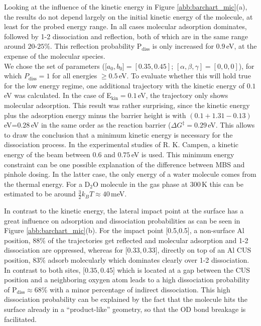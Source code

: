 \documentclass[11pt,DIV=13,BCOR=5mm,a4paper,headinclude]{scrbook}
\begin{document}
Looking at the influence of the kinetic energy in Figure \ref{abb:barchart_mic}(a), the results do not depend largely on the initial kinetic energy of the molecule, at least for the probed energy range.
In all cases molecular adsorption dominates, followed by 1-2 dissociation and reflection, both of which are in the same range around $20$-$25\%$.
This reflection probability P$_\textrm{diss}$ is only increased for $0.9\,$eV, at the expense of the molecular species.\\
We chose the set of parameters ([$a_0,b_0]=[0.35,0.45]$; $[\alpha,\beta,\gamma]=[0,0,0]$), for which $P_\textrm{diss}=1$ for all energies $\geq 0.5\,$eV.
To evaluate whether this will hold true for the low energy regime, one additional trajectory with the kinetic energy of $0.1\,$eV was calculated.
In the case of E$_\textrm{kin}=0.1\,$eV, the trajectory only shows molecular adsorption.
This result was rather surprising, since the kinetic energy plus the adsorption energy minus the barrier height is with $(0.1+1.31-0.13)\,$eV=$0.28\,$eV in the same order as the reaction barrier ($\Delta G^\ddagger=0.29\,$eV\cite{WirthJPCC2012}. %
This allows to draw the conclusion that a minimum kinetic energy is necessary for the dissociation process.
In the experimental studies of R. K. Campen\cite{Heiden11-20_2018}, a kinetic energy of the beam between $0.6$ and $0.75\,$eV is used.
This minimum energy constraint can be one possible explanation of the difference between MBS and pinhole dosing.
In the latter case, the only energy of a water molecule comes from the thermal energy.
For a D$_2$O molecule in the gas phase at $300\,$K this can be estimated to be around $\frac{3}{2}k_BT\approx40\,$meV.


In contrast to the kinetic energy, the lateral impact point at the surface has a great influence on adsorption and dissociation probabilities as can be seen in Figure \ref{abb:barchart_mic}(b).
For the impact point [0.5,0.5], a non-surface Al position, $88\%$ of the trajectories get reflected and molecular adsorption and 1-2 dissociation are oppressed, whereas for [$0.33,0.33$], directly on top of an Al CUS position, $83\%$ adsorb molecularly which dominates clearly over 1-2 dissociation.
In contrast to both sites, [$0.35,0.45$] which is located at a gap between the CUS position and a neighboring oxygen atom leads to a high dissociation probability of P$_\textrm{diss}\approx 68\%$ with a minor percentage of indirect dissociation.
This high dissociation probability can be explained by the fact that the molecule hits the surface already in a ``product-like'' geometry, so that the OD bond breakage is facilitated.
\end{document}
